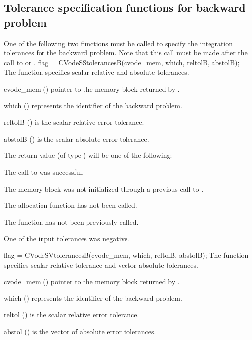 \subsection{Tolerance specification functions for backward problem}
\label{sss:cvtolerances_b}
One of the following two functions must be called to specify the integration
tolerances for the backward problem. Note that this call must be made after the
call to  or .
{
  flag = CVodeSStolerancesB(cvode\_mem, which, reltolB, abstolB);
}
{
  The function  specifies scalar relative and absolute
  tolerances.
}
{
  \begin{args}
  \item[cvode\_mem] ()
    pointer to the {\cvodes} memory block returned by .
  \item[which] ()
    represents the identifier of the backward problem.
  \item[reltolB] ()
    is the scalar relative error tolerance.
  \item[abstolB] ()
    is the scalar absolute error tolerance.
  \end{args}
}
{
  The return value  (of type ) will be one of the following:
  \begin{args}
  \item[\Id{CV\_SUCCESS}]
    The call to  was successful.
  \item[\Id{CV\_MEM\_NULL}]
    The {\cvodes} memory block was not initialized through a previous call to
    .
  \item[\Id{CV\_NO\_MALLOC}]
    The allocation function  has not been called.
  \item[\Id{CV\_NO\_ADJ}]
    The function  has not been previously called.
  \item[\Id{CV\_ILL\_INPUT}]
    One of the input tolerances was negative.
  \end{args}
}
{}
{
  flag = CVodeSVtolerancesB(cvode\_mem, which, reltolB, abstolB);
}
{
  The function  specifies scalar relative tolerance and
  vector absolute tolerances.
}
{
  \begin{args}
  \item[cvode\_mem] ()
    pointer to the {\cvodes} memory block returned by .
  \item[which] ()
    represents the identifier of the backward problem.
  \item[reltol] ()
    is the scalar relative error tolerance.
  \item[abstol] ()
    is the vector of absolute error tolerances.
  \end{args}
}
